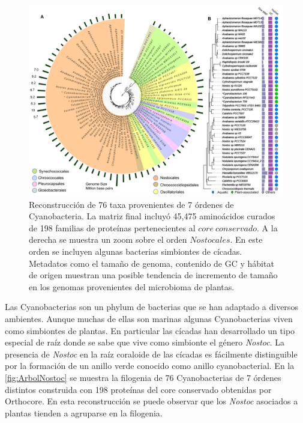 \documentclass[12pt,twoside]{reedthesis}
\begin{document}
  \begin{figure}[h!tbp]
  \centering
  \includegraphics[angle = 0,scale = .45]{chapter1/Nostoc.png}
  \caption[Arbol filogenético de $Nostoc$ construido utilizando  la selección de genes del $core~conservado$]{\footnotesize{Reconstrucción de 76 taxa provenientes de 7 órdenes de Cyanobacteria. La matriz final incluyó 45,475 aminoácidos curados de 198 familias de proteínas pertenecientes al $core~conservado$. A la derecha se muestra un zoom sobre el orden $Nostocales$. En este orden se incluyen algunas bacterias simbiontes de cícadas. Metadatos como el tamaño de genoma, contenido de GC y hábitat de origen muestran una posible tendencia de incremento de tamaño en los genomas provenientes del microbioma de plantas.}}
  \label{fig:ArbolNostoc}
  \end{figure}
  
  Las Cyanobacterias son un phylum de bacterias que se han adaptado a
  diversos ambientes. Aunque muchas de ellas son marinas algunas
  Cyanobacterias viven como simbiontes de plantas. En particular las
  cícadas han desarrollado un tipo especial de raíz donde se sabe que vive
  como simbionte el género \emph{Nostoc}. La presencia de \emph{Nostoc} en
  la raíz coraloide de las cícadas es fácilmente distinguible por la
  formación de un anillo verde conocido como anillo cyanobacterial. En la
  \autoref{fig:ArbolNostoc} se muestra la filogenia de 76 Cyanobacterias
  de 7 órdenes distintos construida con 198 proteínas del core conservado
  obtenidas por Orthocore. En esta reconstrucción se puede observar que
  los \emph{Nostoc} asociados a plantas tienden a agruparse en la
  filogenia.
  
\end{document}
